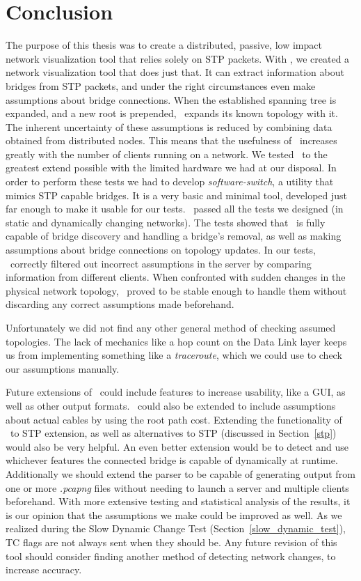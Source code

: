 \chapter{Conclusion}
\label{conclusion}
The purpose of this thesis was to create a distributed, passive, low impact network visualization tool that relies solely on STP packets.
With \tool, we created a network visualization tool that does just that.
It can extract information about bridges from STP packets, and under the right circumstances even make assumptions about bridge connections.
When the established spanning tree is expanded, and a new root is prepended, \tool\ expands its known topology with it.
The inherent uncertainty of these assumptions is reduced by combining data obtained from distributed nodes.
This means that the usefulness of \tool\ increases greatly with the number of clients running on a network.
We tested \tool\ to the greatest extend possible with the limited hardware we had at our disposal.
In order to perform these tests we had to develop \textit{software-switch}, a utility that mimics STP capable bridges.
It is a very basic and minimal tool, developed just far enough to make it usable for our tests.
\tool\ passed all the tests we designed (in static and dynamically changing networks).
The tests showed that \tool\ is fully capable of bridge discovery and handling a bridge's removal, as well as making assumptions about bridge connections on topology updates.
In our tests, \tool\ correctly filtered out incorrect assumptions in the server by comparing information from different clients.
When confronted with sudden changes in the physical network topology, \tool\ proved to be stable enough to handle them without discarding any correct assumptions made beforehand.

Unfortunately we did not find any other general method of checking assumed topologies.
The lack of mechanics like a hop count on the Data Link layer keeps us from implementing something like a \textit{traceroute}, which we could use to check our assumptions manually.

Future extensions of \tool\ could include features to increase usability, like a GUI, as well as other output formats.
\tool\ could also be extended to include assumptions about actual cables by using the root path cost.
Extending the functionality of \tool\ to STP extension, as well as alternatives to STP (discussed in Section~\ref{stp}) would also be very helpful.
An even better extension would be to detect and use whichever features the connected bridge is capable of dynamically at runtime.
Additionally we should extend the parser to be capable of generating output from one or more \textit{.pcapng} files without needing to launch a server and multiple clients beforehand.
With more extensive testing and statistical analysis of the results, it is our opinion that the assumptions we make could be improved as well.
As we realized during the Slow Dynamic Change Test (Section~\ref{slow_dynamic_test}), TC flags are not always sent when they should be.
Any future revision of this tool should consider finding another method of detecting network changes, to increase accuracy.

